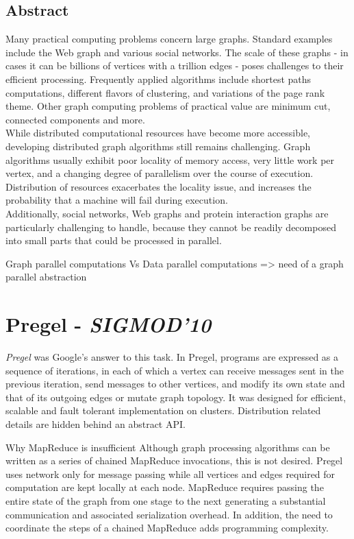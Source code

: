 \documentclass[letterpaper,twocolumn,10pt]{article}
\begin{document}
\subsection*{Abstract}
Many practical computing problems concern large graphs. Standard examples include the Web graph and various social networks. The scale of these graphs - in cases it can be billions of vertices with a trillion edges - poses challenges to their efficient processing.
Frequently applied algorithms include shortest paths computations, different flavors of clustering, and variations of the page rank theme. Other graph computing problems of practical value are minimum cut, connected components and more.\\
While distributed computational resources have become more accessible, developing distributed graph algorithms still remains challenging.
Graph algorithms usually exhibit poor locality of memory access, very little work per vertex, and a changing degree of parallelism over the course of execution. Distribution of resources exacerbates the locality issue, and increases the probability that a machine 
will fail during execution.\\
Additionally, social networks, Web graphs and protein interaction graphs are particularly challenging to handle, because they cannot be readily decomposed into small parts that could be processed in parallel.

Graph parallel computations Vs Data parallel computations => need of a graph parallel abstraction



\section{Pregel - \textit{SIGMOD'10}}
\textit{Pregel} was Google's answer to this task. In Pregel, programs are expressed as a sequence of iterations, in each of which a vertex can receive messages sent in the previous iteration, send messages to other vertices, and modify its own state and that of its outgoing edges or mutate graph topology. It was designed for efficient, scalable and fault tolerant implementation on clusters. Distribution related details are hidden behind an abstract API.

Why MapReduce is insufficient
Although graph processing algorithms can be written as a series of chained MapReduce invocations, this is not desired. Pregel uses network only for message passing while all vertices and edges required for computation are kept locally at each node. MapReduce requires passing the entire state of the graph from one stage to the next generating a substantial communication and associated serialization overhead. In addition, the need to coordinate the steps of a chained MapReduce adds programming complexity.
\end{document}
